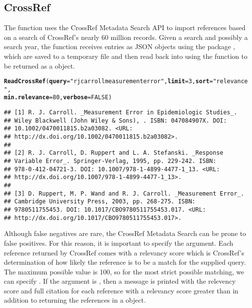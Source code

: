 \documentclass[article]{jss}\usepackage[]{graphicx}\usepackage[]{color}
\makeatletter
\newcommand{\hlnum}[1]{\textcolor[rgb]{0.125,0.125,1}{#1}}%
\newcommand{\hlstr}[1]{\textcolor[rgb]{0.125,0.125,1}{#1}}%
\newcommand{\hlstd}[1]{\textcolor[rgb]{0.251,0.251,0.282}{#1}}%
\newcommand{\hlkwc}[1]{\textcolor[rgb]{0.529,0,0.184}{\textbf{#1}}}%
\newcommand{\hlkwd}[1]{\textcolor[rgb]{0.251,0.251,0.282}{\textbf{#1}}}%
\newenvironment{kframe}{%
 \def\at@end@of@kframe{}%
 \ifinner\ifhmode%
  \def\at@end@of@kframe{\end{minipage}}%
  \begin{minipage}{\columnwidth}%
 \fi\fi%
 \def\FrameCommand##1{\hskip\@totalleftmargin \hskip-\fboxsep
 \colorbox{shadecolor}{##1}\hskip-\fboxsep
     \hskip-\linewidth \hskip-\@totalleftmargin \hskip\columnwidth}%
 \MakeFramed {\advance\hsize-\width
   \@totalleftmargin\z@ \linewidth\hsize
   \@setminipage}}%
 {\par\unskip\endMakeFramed%
 \at@end@of@kframe}
\newenvironment{knitrout}{}{} %
\makeatother
\begin{document}
\subsection{CrossRef}
The function  uses the CrossRef Metadata Search API to import references based on a search of CrossRef's nearly 60 million records.  Given a search and possibly a search year, the function receives \Bibtex{} entries as JSON objects using the  package \citep{RJSONIO}, which are saved to a temporary file and then read back into \R{} using the  function to be returned as a  object.
\begin{knitrout}
\color{fgcolor}\begin{kframe}
\begin{alltt}
\hlkwd{ReadCrossRef}\hlstd{(}\hlkwc{query} \hlstd{=} \hlstr{"rj carroll measurement error"}\hlstd{,} \hlkwc{limit} \hlstd{=} \hlnum{3}\hlstd{,} \hlkwc{sort} \hlstd{=} \hlstr{"relevance"}\hlstd{,}
    \hlkwc{min.relevance} \hlstd{=} \hlnum{80}\hlstd{,} \hlkwc{verbose} \hlstd{=} \hlnum{FALSE}\hlstd{)}
\end{alltt}
\begin{verbatim}
## [1] R. J. Carroll. _Measurement Error in Epidemiologic Studies_.
## Wiley Blackwell (John Wiley & Sons), . ISBN: 047084907X. DOI:
## 10.1002/0470011815.b2a03082. <URL:
## http://dx.doi.org/10.1002/0470011815.b2a03082>.
## 
## [2] R. J. Carroll, D. Ruppert and L. A. Stefanski. _Response
## Variable Error_. Springer-Verlag, 1995, pp. 229-242. ISBN:
## 978-0-412-04721-3. DOI: 10.1007/978-1-4899-4477-1_13. <URL:
## http://dx.doi.org/10.1007/978-1-4899-4477-1_13>.
## 
## [3] D. Ruppert, M. P. Wand and R. J. Carroll. _Measurement Error_.
## Cambridge University Press, 2003, pp. 268-275. ISBN:
## 9780511755453. DOI: 10.1017/CBO9780511755453.017. <URL:
## http://dx.doi.org/10.1017/CBO9780511755453.017>.
\end{verbatim}
\end{kframe}
\end{knitrout}


Although false negatives are rare, the CrossRef Metadata Search can be prone to false positives.  For this reason, it is important to specify the  argument.  Each reference returned by CrossRef comes with a relevancy score which is CrossRef's determination of how likely the reference is to be a match for the supplied query.  The maximum possible value is 100, so for the most strict possible matching, we can specify .  If the argument  is , then a message is printed with the relevency score and full citation for each reference with a relevancy score greater than  in addition to returning the references in a  object.
\end{document}
